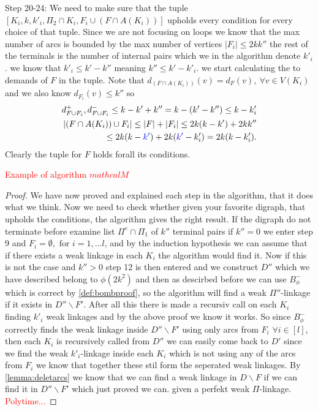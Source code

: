     Step 20-24: We need to make sure that the tuple $[K_i,k,k'_i,\Pi_2 \cap K_i,F_i\cup(F\cap A(K_i))]$ upholds every condition for every choice of that tuple. 
    Since we are not focusing on loops we know that the max number of arcs is bounded by the max number of vertices $|F_i|\leq 2kk''$ the rest of the terminals is the number of internal pairs which we in the algorithm denote $k'_i$. we know that $k'_i\leq k'-k''$ meaning $k''\leq k'-k'_i$.
    we start calculating the to demands of $F$ in the tuple.
    Note that $d_{(F\cap A(K_i))}(v)=d_{F}(v), \ \forall v\in V(K_i)$ and we also know $d_{F_i}(v)\leq k''$ so
    \begin{align}
        d^+_{F\cup F_i},d^-_{F\cup F_i}\leq k-k' + k'' = k-(k'-k'')\leq k- k'_i \\
        |(F \cap A(K_i))\cup F_i|\leq |F|+|F_i|\leq 2k(k-k') +2kk''\\
        \leq 2k(k-\textcolor{blue}{k'})+2k(\textcolor{blue}{k'}-k'_i)=2k(k-k'_i).
    \end{align}
    Clearly the tuple for $F$ holds forall its conditions.

\textcolor{red}{Example of algorithm $mathcal{M}$}
\begin{proof}
    We have now proved and explained each step in the algorithm, that it does what we think. 
    Now we need to check whether given your favorite digraph, that upholds the conditions, the algorithm gives the right result.
    If the digraph do not terminate before examine list $\Pi^e\cap \Pi_1$ of $k''$ terminal pairs if $k''=0$ we enter step 9 and $F_i=\emptyset, \text{ for } i=1,\dots l$, and by the induction hypothesis we can assume that if there exists a weak linkage in each $K_i$ the algorithm would find it. 
    Now if this is not the case and $k''>0$ step 12 is then entered and we construct $D''$ which we have described belong to $\phi(2k^2)$ and then as descirbed before we can use $B_\phi^-$ which is correct by \autoref{def:bombproof}, so the algorithm will find a weak $\Pi''$-linkage if it exists in $D''\backslash F'$. 
    After all this there is made a recursiv call on each $K_i$ finding $k'_i$ weak linkages and by the above proof we know it works. 
    So since $B_\phi^-$ correctly finds the weak linkage inside $D''\backslash F'$ using only arcs from $F_i$ $\forall i\in[l]$, then each $K_i$ is recursively called from $D''$ we can easily come back to $D'$ since we find the weak $k'_i$-linkage inside each $K_i$ which is not using any of the arcs from $F_i$ we know that together these stil form the seperated weak linkages.
    By \autoref{lemma:deletarcs} we know that we can find a weak linkage in $D\backslash F$ if we can find it in $D''\backslash F'$ which just proved we can. given a perfekt weak $\Pi$-linkage.
 \textcolor{red}{Polytime...}
\end{proof}

